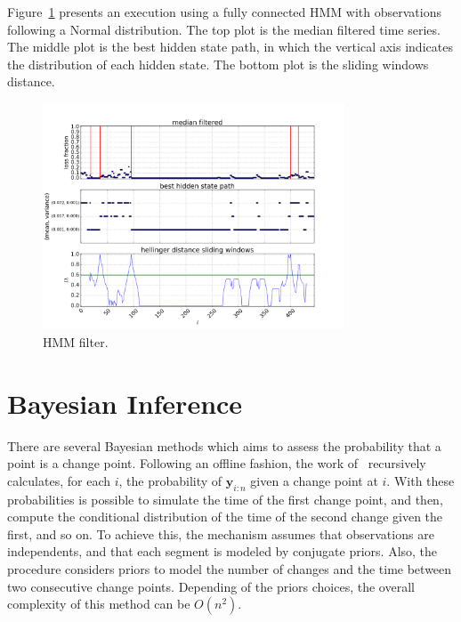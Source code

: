 Figure~\ref{fig:hmm_filter} presents an execution using a fully connected HMM
with observations following a Normal distribution.
The top plot is the median filtered time series.
The middle plot is the best hidden state path, in which the vertical axis
indicates the distribution of each hidden state.
The bottom plot is the sliding windows distance.

\begin{figure}[H]
    \centering
    \includegraphics[width=0.8\textwidth]{./figures/change_point_detection/gaussian_hmm/id115_serverRJODTCLDM031_mac64:66:B3:7B:A1:B8_dtstart2016-05-01_dtend2016-05-11.png}
    \caption{HMM filter.}
\label{fig:hmm_filter}
\end{figure}%

\section{Bayesian Inference}

There are several Bayesian methods which aims to assess the probability that a
point is a change point. Following an offline fashion, the work
of~\cite{exact_and_efficient_bayesian_inference_for_multiple_changepoint_problems}
recursively calculates, for each $i$, the probability of $\mathbf{y}_{i : n}$
given a change point at $i$. With these probabilities is possible to simulate
the time of the first change point, and then, compute the conditional
distribution of the time of the second change given the first, and so on. To
achieve this, the mechanism assumes that observations are independents, and that
each segment is modeled by conjugate priors. Also, the procedure considers
priors to model the number of changes and the time between two consecutive
change points. Depending of the priors choices, the overall complexity of this
method can be $O(n^{2})$.


